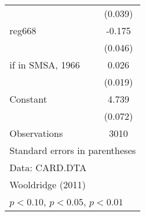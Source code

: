 \begin{table}[htbp]
\begin{tabular}{l*{1}{c}}
                    &     (0.039)         \\
\addlinespace
reg668              &      -0.175\sym{***}\\
                    &     (0.046)         \\
\addlinespace
=1 if in SMSA, 1966 &       0.026         \\
                    &     (0.019)         \\
\addlinespace
Constant            &       4.739\sym{***}\\
                    &     (0.072)         \\
\midrule
Observations        &        3010         \\
\bottomrule
\multicolumn{2}{l}{\footnotesize Standard errors in parentheses}\\
\multicolumn{2}{l}{\footnotesize Data: CARD.DTA}\\
\multicolumn{2}{l}{\footnotesize Wooldridge (2011)}\\
\multicolumn{2}{l}{\footnotesize \sym{*} \(p<0.10\), \sym{**} \(p<0.05\), \sym{***} \(p<0.01\)}\\
\end{tabular}
\end{table}
